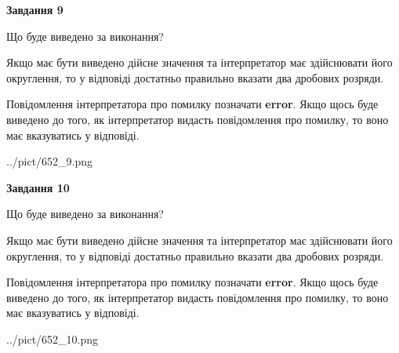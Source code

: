 \documentclass[12pt, ukrainian]{article}
\begin{document}
{\begin {Large}
{\begin {center}\textbf{Завдання 9}\end {center}}\par
Що буде виведено за виконання? \par

Якщо має бути виведено дійсне значення та інтерпретатор має здійснювати його округлення, 
то у відповіді достатньо правильно вказати два дробових розряди.

Повідомлення інтерпретатора про помилку позначати \textbf{error}.
Якщо щось буде виведено до того, як інтерпретатор видасть повідомлення про помилку, 
то воно має вказуватись у відповіді. \par

\begin{center}
	{../pict/652_9.png}
\end{center}
\newpage

{\begin {center}\textbf{Завдання 10}\end {center}}\par
Що буде виведено за виконання? \par

Якщо має бути виведено дійсне значення та інтерпретатор має здійснювати його округлення, 
то у відповіді достатньо правильно вказати два дробових розряди.

Повідомлення інтерпретатора про помилку позначати \textbf{error}.
Якщо щось буде виведено до того, як інтерпретатор видасть повідомлення про помилку, 
то воно має вказуватись у відповіді. \par

\begin{center}
	{../pict/652_10.png}
\end{center}
\newpage

\end {Large}}
\end{document}
